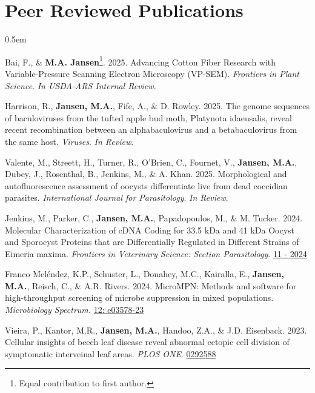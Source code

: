 \documentclass[12pt,a4paper]{article}
\begin{document}
\section*{Peer Reviewed Publications}
\begin{description}
	\itemsep 0.5em
	
	\item Bai, F., \& \textbf{M.A. Jansen}\footnote[2]{Equal contribution to first author.}. 2025. Advancing Cotton Fiber Research with Variable-Pressure Scanning Electron Microscopy (VP-SEM). \textit{Frontiers in Plant Science}. \textit{In USDA-ARS Internal Review}.
	
	\item Harrison, R., \textbf{Jansen, M.A.}, Fife, A., \& D. Rowley. 2025. The genome sequences of baculoviruses from the tufted apple bud moth, Platynota idaeusalis, reveal recent recombination between 
	an alphabaculovirus and a betabaculovirus from the same host. \textit{Viruses}. \textit{In Review}.
	
	\item Valente, M., Streett, H., Turner, R., O’Brien, C., Fournet, V., \textbf{Jansen, M.A.}, Dubey, J., Rosenthal, B., Jenkins, M., \& A. Khan. 2025. Morphological and autofluorescence assessment of oocysts differentiate live from dead coccidian parasites. \textit{International Journal for Parasitology}. \textit{In Review}.
	
	\item Jenkins, M., Parker, C., \textbf{Jansen, M.A.}, Papadopoulos, M., \& M. Tucker. 2024. Molecular Characterization of cDNA Coding for 33.5 kDa and 41 kDa Oocyst and Sporocyst Proteins that are Differentially Regulated in Different Strains of Eimeria maxima. \textit{Frontiers in Veterinary Science: Section Parasitology}. \href{https://doi.org/10.3389/fvets.2024.1445646}{11 - 2024}
	
	\item Franco Mel\'{e}ndez, K.P., Schuster, L., Donahey, M.C., Kairalla, E., \textbf{Jansen, M.A.}, Reisch, C., \& A.R. Rivers. 2024. MicroMPN: Methods and software for high-throughput screening of microbe suppression in mixed populations. \textit{Microbiology Spectrum.} \href{https://doi.org/10.1128/spectrum.03578-23}{12: e03578-23}
	
	\item Vieira, P., Kantor, M.R., \textbf{Jansen, M.A.}, Handoo, Z.A., \& J.D. Eisenback. 2023. Cellular insights of beech leaf disease reveal abnormal ectopic cell division of symptomatic interveinal leaf areas. \textit{PLOS ONE}. \href{https://doi.org/10.1371/journal.pone.0292588}{0292588}
	

\end{description}
\end{document}

